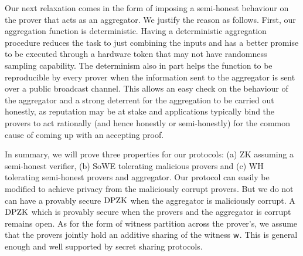  Our next relaxation comes in the form of imposing a semi-honest behaviour on the prover that acts as an aggregator. We justify the reason as follows.  First,  our aggregation function is deterministic. Having  a deterministic aggregation procedure reduces the task to just combining the inputs and has a better promise to be executed through a hardware token that may not have randomness sampling capability.  The determinism also in part helps the function to be reproducible by every prover  when the information sent to the aggregator is sent over a public broadcast channel. This allows an easy check on the behaviour of the aggregator and a strong deterrent for the aggregation to be carried out honestly, as reputation may be at stake and applications typically bind the provers to act rationally (and hence honestly or semi-honestly) for the common cause of coming up with an accepting proof.  %


In summary,  we will prove three properties for our protocols: (a) ZK assuming a
semi-honest verifier, (b)  SoWE tolerating  malicious provers and (c) WH
tolerating semi-honest provers and aggregator. Our protocol can easily be modified to achieve privacy from the maliciously corrupt provers. But we do not can have a provably secure $\text{DPZK}$ when the aggregator is maliciously corrupt. A $\text{DPZK}$ which is provably secure when the provers and the aggregator is corrupt remains open. 
As for the form of witness
partition across the prover's, we assume that the provers jointly hold an
additive sharing of the witness $\mathsf{w}$. This is general enough and well
supported by secret sharing protocols.

